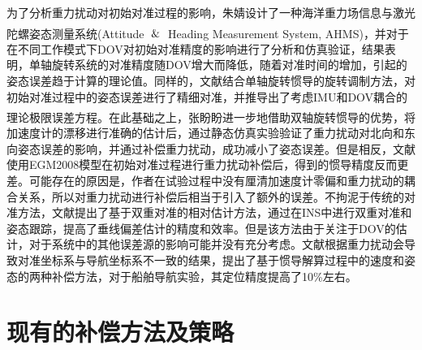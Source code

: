 \documentclass[12pt,a4,utf8]{article}
\newcommand{\upcite}[1]{\textsuperscript{\textsuperscript{\cite{#1}}}} %
\begin{document}
为了分析重力扰动对初始对准过程的影响，朱婧设计了一种海洋重力场信息与激光陀螺姿态测量系统(Attitude $\And$ Heading Measurement System, AHMS)\upcite{1020386196.nh}，并对于在不同工作模式下DOV对初始对准精度的影响进行了分析和仿真验证，结果表明，单轴旋转系统的对准精度随DOV增大而降低，随着对准时间的增加，引起的姿态误差趋于计算的理论值。同样的，文献\cite{hao2022analysis}结合单轴旋转惯导的旋转调制方法，对初始对准过程中的姿态误差进行了精细对准，并推导出了考虑IMU和DOV耦合的理论极限误差方程。在此基础之上，张盼盼进一步地借助双轴旋转惯导的优势\upcite{zhang2023gravity}，将加速度计的漂移进行准确的估计后，通过静态仿真实验验证了重力扰动对北向和东向姿态误差的影响，并通过补偿重力扰动，成功减小了姿态误差。但是相反，文献\cite{TIE2017impact}使用EGM2008模型在初始对准过程进行重力扰动补偿后，得到的惯导精度反而更差。可能存在的原因是，作者在试验过程中没有厘清加速度计零偏和重力扰动的耦合关系，所以对重力扰动进行补偿后相当于引入了额外的误差。不拘泥于传统的对准方法，文献\cite{hao2022analysis}提出了基于双重对准的相对估计方法，通过在INS中进行双重对准和姿态跟踪，提高了垂线偏差估计的精度和效率。但是该方法由于关注于DOV的估计，对于系统中的其他误差源的影响可能并没有充分考虑。文献\cite{tie2018compensation}根据重力扰动会导致对准坐标系与导航坐标系不一致的结果，提出了基于惯导解算过程中的速度和姿态的两种补偿方法，对于船舶导航实验，其定位精度提高了10\%左右。

\section{现有的补偿方法及策略}
\end{document}
